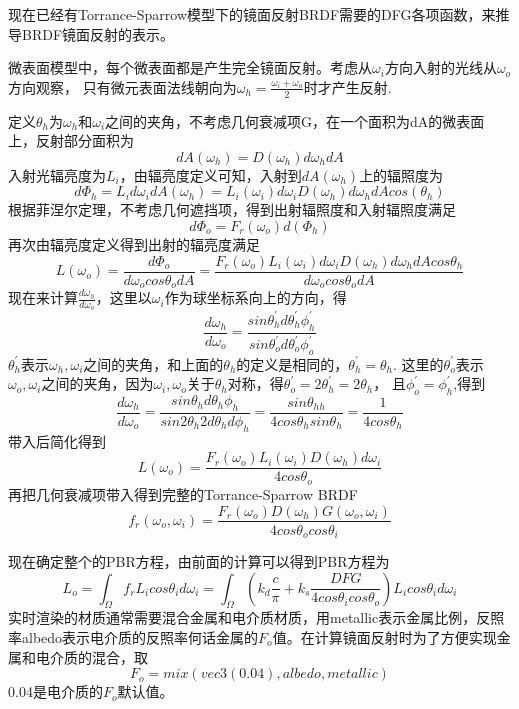 现在已经有Torrance-Sparrow模型下的镜面反射BRDF需要的DFG各项函数，来推导BRDF镜面反射的表示。

微表面模型中，每个微表面都是产生完全镜面反射。考虑从${\omega}_{i}$方向入射的光线从${\omega}_{o}$方向观察，
只有微元表面法线朝向为${\omega}_{h}=\frac{{\omega}_{i}+{\omega}_{o}}{2}$时才产生反射.

定义${\theta}_{h}$为${\omega}_{h}$和${\omega}_{i}$之间的夹角，不考虑几何衰减项G，在一个面积为dA的微表面上，反射部分面积为
$$
dA({\omega}_{h})=D({\omega}_{h})d{\omega}_{h}dA 
$$
入射光辐亮度为$L_{i}$，由辐亮度定义可知，入射到$dA({\omega}_{h})$上的辐照度为
$$
d{\Phi}_{h}=L_{i}d{\omega}_{i}dA({\omega}_{h})=L_{i}({\omega}_{i})d{\omega}_{i}D({\omega}_{h})d{\omega}_{h}dAcos({\theta}_{h}) 
$$
根据菲涅尔定理，不考虑几何遮挡项，得到出射辐照度和入射辐照度满足
$$
d{\Phi}_{o}=F_{r}({\omega}_{o})d({\Phi}_{h})
$$
再次由辐亮度定义得到出射的辐亮度满足
$$
L({\omega}_{o})=\frac{d{\Phi}_{o}}{d{\omega}_{o}cos{\theta}_{o}dA}=\frac{F_{r}({\omega}_{o})L_{i}({\omega}_{i})d{\omega}_{i}D({\omega}_{h})d{\omega}_{h}dAcos{\theta}_{h}}{d{\omega}_{o}cos{\theta}_{o}dA}
$$
现在来计算$\frac{d{\omega}_{h}}{d{\omega}_{o}}$，这里以${\omega}_{i}$作为球坐标系向上的方向，得
$$
\frac{d{\omega}_{h}}{d{\omega}_{o}}=\frac{sin{\theta}_{h}^{'}d{\theta}_{h}^{'}{\phi}_{h}^{'}}{sin{\theta}_{o}^{'}d{\theta}_{o}^{'}{\phi}_{o}^{'}}
$$
${\theta}_{h}^{'}$表示${\omega}_{h},{\omega}_{i}$之间的夹角，和上面的${\theta}_{h}$的定义是相同的，${\theta}_{h}^{'}={\theta}_{h}$. 这里的${\theta}_{o}^{'}$表示
${\omega}_{o},{\omega}_{i}$之间的夹角，因为${\omega}_{i},{\omega}_{o}$关于${\theta}_{h}$对称，得${\theta}_{o}^{'}=2{\theta}_{h}^{'}=2{\theta}_{h}$，
且${\phi}_{o}^{'}={\phi}_{h}^{'}$,得到
$$
\frac{d{\omega}_{h}}{d{\omega}_{o}}=\frac{sin{\theta}_{h}d{\theta}_{h}{\phi}_{h}}{sin{2\theta}_{h}2d{\theta}_{h}d{\phi}_{h}}=\frac{sin{\theta}_{hh}}{4cos{\theta}_{h}sin{\theta}_{h}}=\frac{1}{4cos{\theta}_{h}}
$$
带入后简化得到
$$
L({\omega}_{o})=\frac{F_{r}({\omega}_{o})L_{i}({\omega}_{i})D({\omega}_{h})d{\omega}_{i}}{4cos{\theta}_{o}}
$$
再把几何衰减项带入得到完整的Torrance-Sparrow BRDF 
$$
f_{r}({\omega}_{o},{\omega}_{i})=\frac{F_{r}({\omega}_{o})D({\omega}_{h})G({\omega}_{o},{\omega}_{i})}{4cos{\theta}_{o}cos{\theta}_{i}}
$$

现在确定整个的PBR方程，由前面的计算可以得到PBR方程为
$$
L_{o}=\int_{\Omega}f_{r}L_{i}cos{\theta}_{i}d{\omega}_{i}=\int_{\Omega}(k_{d}\frac{c}{\pi}+k_{s}\frac{DFG}{4cos{\theta}_{i}cos{\theta}_{o}})L_{i}cos{\theta}_{i}d{\omega}_{i}
$$
实时渲染的材质通常需要混合金属和电介质材质，用metallic表示金属比例，反照率albedo表示电介质的反照率何话金属的$F_{o}$值。在计算镜面反射时为了方便实现金属和电介质的混合，取
$$
F_{o}=mix(vec3(0.04), albedo, metallic)
$$
0.04是电介质的$F_{o}$默认值。

